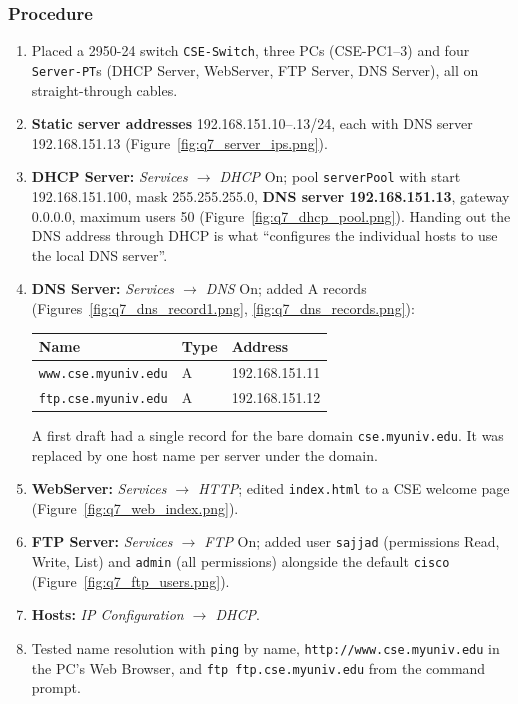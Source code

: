 \documentclass[11pt]{article}
\begin{document}
\subsubsection*{Procedure}
\begin{enumerate}[leftmargin=1.8em]
  \item Placed a 2950-24 switch \texttt{CSE-Switch}, three PCs (CSE-PC1--3) and four
  \texttt{Server-PT}s (DHCP Server, WebServer, FTP Server, DNS Server), all on
  straight-through cables.
  \item \textbf{Static server addresses} 192.168.151.10--.13/24, each with DNS server
  192.168.151.13 (Figure~\ref{fig:q7_server_ips.png}).
  \item \textbf{DHCP Server:} \emph{Services $\to$ DHCP} On; pool \texttt{serverPool}
  with start 192.168.151.100, mask 255.255.255.0, \textbf{DNS server 192.168.151.13}, gateway
  0.0.0.0, maximum users 50 (Figure~\ref{fig:q7_dhcp_pool.png}). Handing out the DNS address
  through DHCP is what ``configures the individual hosts to use the local DNS server''.
  \item \textbf{DNS Server:} \emph{Services $\to$ DNS} On; added A records
  (Figures~\ref{fig:q7_dns_record1.png}, \ref{fig:q7_dns_records.png}):
  \begin{center}
  \begin{tabular}{lll}
  \toprule
  \textbf{Name} & \textbf{Type} & \textbf{Address} \\
  \midrule
  \texttt{www.cse.myuniv.edu} & A & 192.168.151.11 \\
  \texttt{ftp.cse.myuniv.edu} & A & 192.168.151.12 \\
  \bottomrule
  \end{tabular}
  \end{center}
  A first draft had a single record for the bare domain \texttt{cse.myuniv.edu}. It was
  replaced by one host name per server under the domain.
  \item \textbf{WebServer:} \emph{Services $\to$ HTTP}; edited \texttt{index.html} to a CSE
  welcome page (Figure~\ref{fig:q7_web_index.png}).
  \item \textbf{FTP Server:} \emph{Services $\to$ FTP} On; added user \texttt{sajjad}
  (permissions Read, Write, List) and \texttt{admin} (all permissions) alongside the default
  \texttt{cisco} (Figure~\ref{fig:q7_ftp_users.png}).
  \item \textbf{Hosts:} \emph{IP Configuration $\to$ DHCP}.
  \item Tested name resolution with \texttt{ping} by name, \texttt{http://www.cse.myuniv.edu}
  in the PC's Web Browser, and \texttt{ftp ftp.cse.myuniv.edu} from the command prompt.
\end{enumerate}
\end{document}
